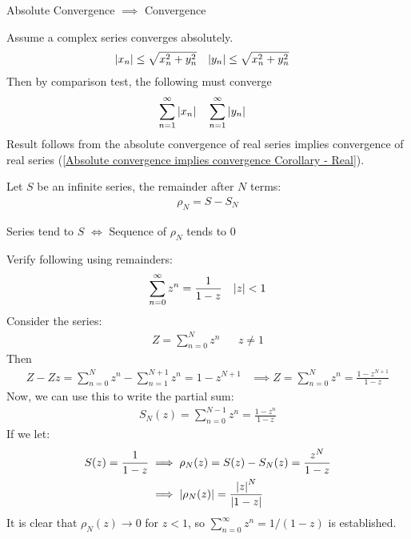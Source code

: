 \documentclass[12pt, english]{book}
\makeatletter
\renewenvironment{proof}[1][\proofname]{\par
	\pushQED{\qed}%
	\normalfont \topsep6\p@\@plus6\p@\relax
	\list{}{%
		\settowidth{\leftmargin}{\itshape\proofname:\hskip\labelsep}%
		\setlength{\labelwidth}{0pt}%
		\setlength{\itemindent}{-\leftmargin}%
	}%
	\item[\hskip\labelsep\itshape#1\@addpunct{:}]\ignorespaces
}{%
	\popQED\endlist\@endpefalse
}
\makeatother
\begin{document}
	\begin{corollary}
		\label{Absolute convergence implies convergence (Complex) Corollary - Complex}
		Absolute Convergence \(\implies\) Convergence
	\end{corollary}
	\begin{proof}
		Assume a complex series converges absolutely. 
		\begin{align*}
			\abs{x_n} &\leq \sqrt{x_n^2 + y_n^2} & \abs{y_n} &\leq \sqrt{x_n^2 + y_n^2}
		\end{align*}
		Then by comparison test, the following must converge
		\begin{align*}
			\sum_{n=1}^{\infty} \abs{x_n} &&& \sum_{n=1}^{\infty} \abs{y_n}
		\end{align*}
		Result follows from the absolute convergence of real series implies convergence of real series (\cref{Absolute convergence implies convergence Corollary - Real}). 
	\end{proof}

	\begin{definition}
		Let \(S\) be an infinite series, the remainder after \(N\) terms:
		\begin{align*}
			\rho_N = S - S_N
		\end{align*}
	\end{definition}

	\begin{corollary}
		Series tend to \(S\) \(\iff\) Sequence of \(\rho_N\) tends to 0
	\end{corollary}

	\begin{example}
		\label{Infinite sum of z^n and remainder for partial sum Example - Complex}
		Verify following using remainders:
		\begin{align*}
			\sum_{n=0}^{\infty} z^n &= \frac{1}{1-z} & \abs{z} < 1
		\end{align*}
		Consider the series:
		\begin{align*}
			Z = \sum_{n=0}^{N} z^n && z \neq 1
		\end{align*}
		Then
		\begin{align*}
			Z - Zz =  \sum_{n=0}^{N} z^n - \sum_{n=1}^{N+1} z^n = 1 - z^{N+1}
			&\implies Z = \sum_{n=0}^{N} z^n = \frac{1-z^{N+1}}{1-z}
		\end{align*}
		Now, we can use this to write the partial sum:
		\begin{align*}
			S_N(z) = \sum_{n=0}^{N-1} z^n = \frac{1-z^n}{1-z}
		\end{align*}
		If we let:
		\begin{align*}
			S(z) = \frac{1}{1-z} 
			&\implies \rho_N(z) = S(z) - S_N(z) = \frac{z^N}{1-z}\\
			&\implies \abs{\rho_N(z)} = \frac{\abs{z}^N}{\abs{1-z}}
		\end{align*}
		It is clear that \(\rho_N(z) \rightarrow 0\) for \(z < 1\), so \(\sum_{n=0}^{\infty} z^n = 1/(1-z)\) is established.
	\end{example}
\end{document}
